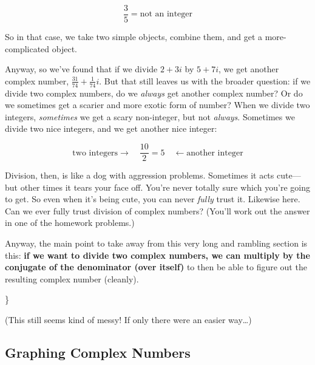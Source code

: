 \documentclass[
]{article}
\begin{document}
\[\frac{3}{5} = \text{not an integer}\]

So in that case, we take two simple objects, combine them, and get a
more-complicated object.

Anyway, so we've found that if we divide \(2+3i\) by \(5+7i\), we get
another complex number, \(\frac{31}{74} + \frac{1}{74}i\). But that
still leaves us with the broader question: if we divide two complex
numbers, do we \emph{always} get another complex number? Or do we
sometimes get a scarier and more exotic form of number? When we divide
two integers, \emph{sometimes} we get a scary non-integer, but not
\emph{always}. Sometimes we divide two nice integers, and we get another
nice integer:

\[\text{two integers} \rightarrow\quad \frac{10}{2} = 5 \quad \longleftarrow\text{another integer}\]

Division, then, is like a dog with aggression problems. Sometimes it
acts cute---but other times it tears your face off. You're never totally
sure which you're going to get. So even when it's being cute, you can
never \emph{fully} trust it. Likewise here. Can we ever fully trust
division of complex numbers? (You'll work out the answer in one of the
homework problems.)

Anyway, the main point to take away from this very long and rambling
section is this: \textbf{if we want to divide two complex numbers, we
can multiply by the conjugate of the denominator (over itself)} to then
be able to figure out the resulting complex number (cleanly).

\medskip
\centerline{
}

\} \medskip

(This still seems kind of messy! If only there were an easier way\ldots)

\hypertarget{graphing-complex-numbers}{%
\subsection{Graphing Complex Numbers}\label{graphing-complex-numbers}}
\end{document}
